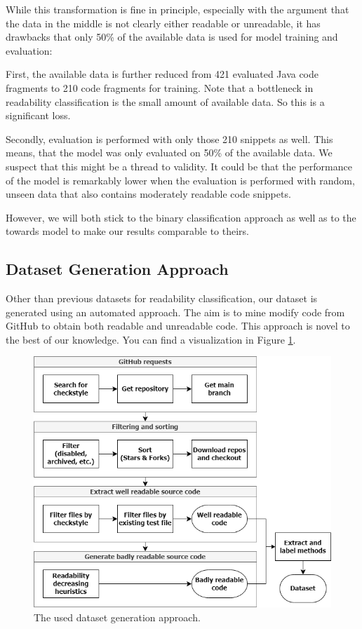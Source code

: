 \documentclass[%
class=scrreprt,
chapterprefix=false,%
open=right,%
twoside=false,%
paper=a4,%
logofile={Logo\_zentral\_farbig\_EN.png},%
thesistype=master,%
UKenglish,%
]{se2thesis}
\theoremstyle{definition}
\begin{document}
	While this transformation is fine in principle, especially with the argument that the data in the middle is not clearly either readable or unreadable, it has drawbacks that only 50\% of the available data is used for model training and evaluation:
	
	First, the available data is further reduced from 421 evaluated Java code fragments to 210 code fragments for training. Note that a bottleneck in readability classification is the small amount of available data. So this is a significant loss.
	
	Secondly, evaluation is performed with only those 210 snippets as well. This means, that the model was only evaluated on 50\% of the available data. We suspect that this might be a thread to validity. It could be that the performance of the model is remarkably lower when the evaluation is performed with random, unseen data that also contains moderately readable code snippets.
	
	However, we will both stick to the binary classification approach as well as to the towards model \cite{mi2022towards} to make our results comparable to theirs.
	
\subsection{Dataset Generation Approach} \label{Dataset Generation Approach}
	Other than previous datasets for readability classification, our dataset is generated using an automated approach. The aim is to mine modify code from GitHub to obtain both readable and unreadable code. This approach is novel to the best of our knowledge. You can find a visualization in Figure \ref{fig:dataset_generation}.
	
	\begin{figure}[t]
		\centering
		\includegraphics[width=\textwidth]{img/dataset_generation.png}
		\caption{The used dataset generation approach.}
		\label{fig:dataset_generation}
	\end{figure}
	
\end{document}
